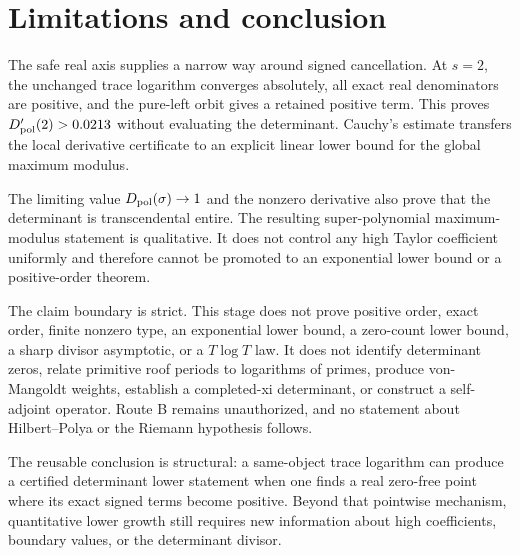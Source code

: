 \section{Limitations and conclusion}

The safe real axis supplies a narrow way around signed cancellation.  At
\(s=2\), the unchanged trace logarithm converges absolutely, all exact real
denominators are positive, and the pure-left orbit gives a retained positive
term.  This proves \(D_{\mathrm{pol}}'(2)>0.0213\) without evaluating the determinant.
Cauchy's estimate transfers the local derivative certificate to an explicit
linear lower bound for the global maximum modulus.

The limiting value \(D_{\mathrm{pol}}(\sigma)\to1\) and the nonzero derivative also
prove that the determinant is transcendental entire.  The resulting
super-polynomial maximum-modulus statement is qualitative.  It does not
control any high Taylor coefficient uniformly and therefore cannot be
promoted to an exponential lower bound or a positive-order theorem.

The claim boundary is strict.  This stage does not prove positive order,
exact order, finite nonzero type, an exponential lower bound, a zero-count
lower bound, a sharp divisor asymptotic, or a \(T\log T\) law.  It does not
identify determinant zeros, relate primitive roof periods to logarithms of
primes, produce von-Mangoldt weights, establish a completed-xi determinant,
or construct a self-adjoint operator.  Route B remains unauthorized, and no
statement about Hilbert--Polya or the Riemann hypothesis follows.

The reusable conclusion is structural: a same-object trace logarithm can
produce a certified determinant lower statement when one finds a real
zero-free point where its exact signed terms become positive.  Beyond that
pointwise mechanism, quantitative lower growth still requires new
information about high coefficients, boundary values, or the determinant
divisor.
